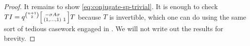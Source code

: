 \begin{proof}
    It remains to show \eqref{eq:conjugate-sp-trivial}. It is enough to check $TI=q^{\binom{n+1}2}\begin{bsmallmatrix}
        -\sigma A\sigma \\ (1,\ldots,1) & 1
    \end{bsmallmatrix}T$ because $T$ is invertible, which one can do using the same sort of tedious casework engaged in . We will not write out the results for brevity.

\end{proof}
